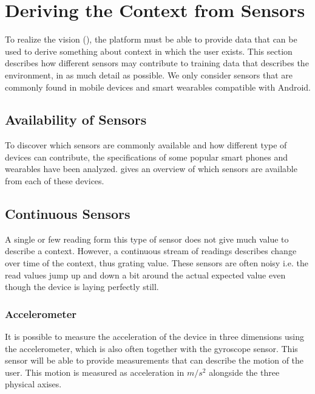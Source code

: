
\section{Deriving the Context from Sensors}
\label{sec:deriving_the_context_from_sensors}

To realize the vision (), the platform must be able to provide data that can be used to derive something about context in which the user exists. This section describes how different sensors may contribute to training data that describes the environment, in as much detail as possible. We only consider sensors that are commonly found in mobile devices and smart wearables compatible with Android. 

\subsection{Availability of Sensors}

To discover which sensors are commonly available and how different type of devices can contribute, the specifications of some popular smart phones and wearables have been analyzed.  gives an overview of which sensors are available from each of these devices. 



\subsection{Continuous Sensors}
A single or few reading form this type of sensor does not give much value to describe a context. However, a continuous stream of readings describes change over time of the context, thus grating value. These sensors are often noisy i.e. the read values jump up and down a bit around the actual expected value even though the device is laying perfectly still.

\subsubsection{Accelerometer}
It is possible to measure the acceleration of the device in three dimensions using the accelerometer, which is also often together with the gyroscope sensor. This sensor will be able to provide measurements that can describe the motion of the user. This motion is measured as acceleration in $m/s^2$ alongside the three physical axises.

